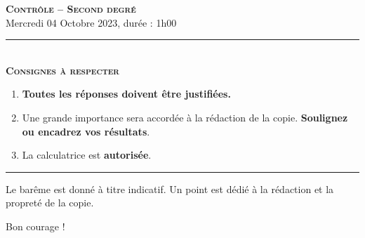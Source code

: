 \documentclass[11pt]{article}
\begin{document}
%
%
%
%
%
%

\begin{center}
\textbf{\LARGE \textsc{Contrôle -- Second degré}}\\[2mm]

{\large Mercredi 04 Octobre 2023, durée : 1h00}\\[1mm]
\noindent\rule{8cm}{0.4pt}\\[1mm]
\textbf{\textsc{Consignes à respecter}}
\begin{enumerate}[label=\textbf{\arabic*/}]
\item \textbf{Toutes les réponses doivent être justifiées.}
\item Une grande importance sera accordée à la rédaction de la
  copie. \textbf{Soulignez ou encadrez vos résultats}.
\item La calculatrice est \textbf{autorisée}.
    \end{enumerate}
\noindent\rule{12cm}{0.4pt}
\end{center}

\vspace{2mm}
\noindent Le barême est donné à titre indicatif. Un point est dédié à la
rédaction et la propreté de la copie.
\vspace{2mm}
\begin{center}
  Bon courage !
\end{center}
\end{document}
